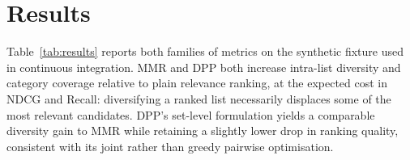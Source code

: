 \section{Results}

Table~\ref{tab:results} reports both families of metrics on the synthetic
fixture used in continuous integration. MMR and DPP both increase
intra-list diversity and category coverage relative to plain relevance
ranking, at the expected cost in NDCG and Recall: diversifying a ranked
list necessarily displaces some of the most relevant candidates. DPP's
set-level formulation yields a comparable diversity gain to MMR while
retaining a slightly lower drop in ranking quality, consistent with its
joint rather than greedy pairwise optimisation.
